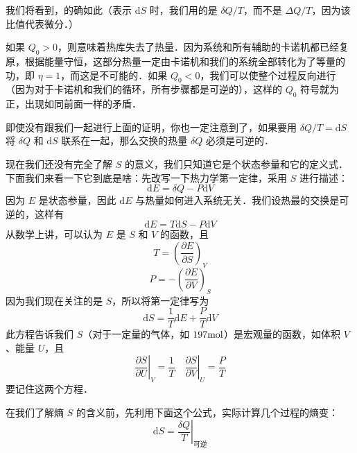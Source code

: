 我们将看到，的确如此（表示 $\mathrm dS $ 时，我们用的是 $\delta Q/T$，而不是 $\Delta Q/T$，因为该比值代表微分．）

如果 $Q_0>0$，则意味着热库失去了热量．因为系统和所有辅助的卡诺机都已经复原，根据能量守恒，这部分热量一定由卡诺机和我们的系统全部转化为了等量的功，即 $\eta=1$，而这是不可能的．如果 $Q_0<0$，我们可以使整个过程反向进行（因为对于卡诺机和我们的循环，所有步骤都是可逆的），这样的 $Q_0$ 符号就为正，出现如同前面一样的矛盾．

即使没有跟我们一起进行上面的证明，你也一定注意到了，如果要用 $\delta Q/T=\mathrm d S$ 将 $\delta Q$ 和 $\mathrm dS$ 联系在一起，那么交换的热量 $\delta Q$ 必须是可逆的．

现在我们还没有完全了解 $S$ 的意义，我们只知道它是个状态参量和它的定义式．下面我们来看一下它到底是啥：先改写一下热力学第一定律，采用 $S$ 进行描述：
\begin{equation}
\mathrm d E = \delta{Q} - P\mathrm d V
\end{equation}
因为 $E$ 是状态参量，因此 $\mathrm d E$ 与热量如何进入系统无关．我们设热最的交换是可逆的，这样有
\begin{equation}
\mathrm d E =T\mathrm dS - P\mathrm d V
\end{equation}
从数学上讲，可以认为 $E$ 是 $S $ 和 $V $ 的函数，且
\begin{equation}
T=\left(\frac{\partial E}{\partial S}\right)_V
\end{equation}
\begin{equation}
P=-\left(\frac{\partial E}{\partial V}\right)_S
\end{equation}
因为我们现在关注的是 $S$，所以将第一定律写为
\begin{equation}
\text{d}S=\frac{1}{T}\text{d}E+\frac{P}{T}\text{d}V
\end{equation}
此方程告诉我们 $S$（对于一定量的气体，如 $197 \rm mol$）是宏观量的函数，如体积 $V $、能量 $U$，且
\begin{equation}
\left. \frac{\partial S}{\partial U} \right|_V=\frac{1}{T}\quad \left. \frac{\partial S}{\partial V} \right|_U=\frac{P}{T}
\end{equation}
要记住这两个方程．

在我们了解熵 $S $ 的含义前，先利用下面这个公式，实际计算几个过程的熵变：
\begin{equation}
\left. \text{d}S=\frac{\delta Q}{T} \right|_{\text{可逆}}
\end{equation}

